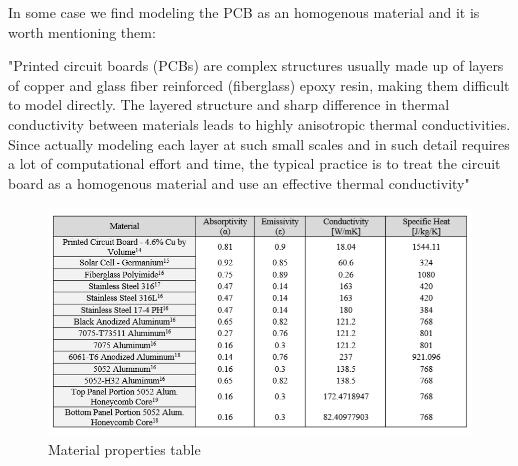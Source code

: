 \documentclass[final]{cubedoc}
\begin{document}
	
	
	
	
	In some case we find modeling the PCB as an homogenous material and it is worth mentioning them:
	
	
	"Printed circuit boards (PCBs) are complex structures usually made up of layers of copper and glass fiber reinforced (fiberglass) epoxy resin, making them difficult to model directly. The layered structure and sharp difference in thermal conductivity between materials leads to highly anisotropic thermal conductivities. Since actually modeling each layer at such small scales and in such detail requires a lot of computational effort and time, the typical practice is to treat the circuit board as a homogenous material and use an effective thermal conductivity" \cite{peake2014cubesat}
	
	\begin{figure}[h!]
		\centering
		\includegraphics[keepaspectratio, height=0.3\textheight, width=\textwidth]{docs/material_properties_table.png}
		\caption{Material properties table  \cite[p.115]{zotero-47}}
		\label{fig:my_label}
	\end{figure}
	
\end{document}
